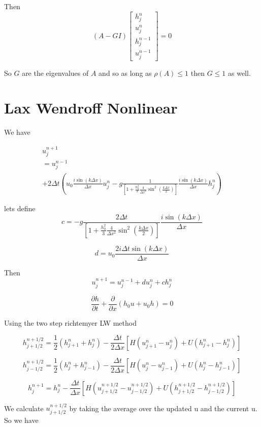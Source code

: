 \documentclass[12pt]{article}
\begin{document}
Then
\[\left(A - GI\right)\left[\begin{array}{c}
h^{n}_j \\
u^{n}_j\\
h^{n-1}_j \\
u^{n-1}_j
\end{array} \right] = 0\]

So $G$ are the eigenvalues of $A$ and so as long as $\rho(A) \le 1$ then $G \le 1$ as well. 


\section{Lax Wendroff Nonlinear}

We have 

\begin{multline}
u^{n+1}_j 
\\ = u^{n-1}_j   \\ + 2 \Delta t\left(u_0\frac{i \sin\left(k \Delta x\right)}{\Delta x} u^n_j   - g\frac{1}{\left[1 +\frac{h_0^2}{3}\frac{4}{\Delta x^2}\sin^2\left(\frac{k\Delta x}{2}\right) \right]}\frac{i \sin\left(k \Delta x\right)}{\Delta x} h^n_j\right)
\end{multline}

lets define
\[c = - g\frac{2 \Delta t}{\left[1 +\frac{h_0^2}{3}\frac{4}{\Delta x^2}\sin^2\left(\frac{k\Delta x}{2}\right) \right]}\frac{i \sin\left(k \Delta x\right)}{\Delta x}\]

\[d =u_0\frac{2i  \Delta t \sin\left(k \Delta x\right)}{\Delta x}\]

Then 
\[u^{n+1}_j  = u^{n-1}_j   +du^n_j   +c h^n_j\]

\[\frac{\partial h}{\partial t} + \frac{\partial}{\partial x} \left(h_0 u + u_0 h\right)= 0\]

Using the two step richtemyer LW method

\[
h^{n+1/2}_{j+1/2} = \frac{1}{2}\left(h^n_{j+1} + h^n_j\right) - \frac{\Delta t}{2\Delta x}\left[H(u^n_{j+1} - u^n_{j}) + U(h^n_{j+1} - h^n_j)\right]
\]

\[
h^{n+1/2}_{j-1/2} = \frac{1}{2}\left(h^n_{j} + h^n_{j-1}\right) - \frac{\Delta t}{2\Delta x}\left[H(u^n_{j} - u^n_{j-1}) + U(h^n_{j} - h^n_{j-1})\right] \]

\[h^{n+1}_{j} = h^n_j - \frac{\Delta t}{\Delta x}\left[H(u^{n+1/2}_{j+1/2} -u^{n+1/2}_{j-1/2} ) + U(h^{n+1/2}_{j+1/2} -h^{n+1/2}_{j-1/2} )\right]\]

We calculate $u^{n+1/2}_{j+1/2}$ by taking the average over the updated u and the current u. So we have
\end{document}
